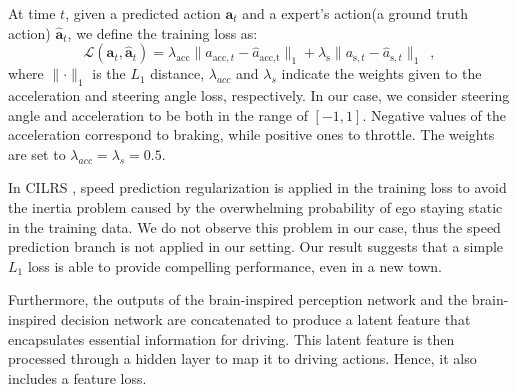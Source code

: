 At time $t$, given a predicted action $\mathbf{a}_{t}$ and a expert's action(a ground truth action) $\hat{\mathbf{a}}_{t}$, we define the training loss as:
\begin{equation}\label{eq:loss}
	\mathcal{L}(\mathbf{a}_t, \hat{\mathbf{a}}_t) = \lambda_{\text{acc}}\lVert a_{\text{acc},t}-\hat{a}_{\text{acc,t}}\rVert_{1} + \lambda_{\text{s}} \lVert a_{\text{s},t}-\hat{a}_{\text{s},t} \rVert_{1} \enspace ,
\end{equation}
where $\lVert\cdot\rVert_{1}$ is the $L_1$ distance, $\lambda_{acc}$ and $\lambda_s$ indicate the weights given to the acceleration and steering angle loss, respectively. 
In our case, we consider steering angle and acceleration to be both in the range of $[-1, 1]$. 
Negative values of the acceleration correspond to braking, while positive ones to throttle.
The weights are set to $\lambda_{acc} = \lambda_{s} = 0.5$. 


In CILRS \cite{Codevilla:2019}, speed prediction regularization is applied in the training loss to avoid the inertia problem caused by the overwhelming probability of ego staying static in the training data. 
We do not observe this problem in our case, thus the speed prediction branch is not applied in our setting. 
Our result suggests that a simple $L_1$ loss is able to provide compelling performance, even in a new town.

Furthermore, the outputs of the brain-inspired perception network and the brain-inspired decision network are concatenated to produce a latent feature that encapsulates essential information for driving. 
This latent feature is then processed through a hidden layer to map it to driving actions. 
Hence, it also includes a feature loss.


%



